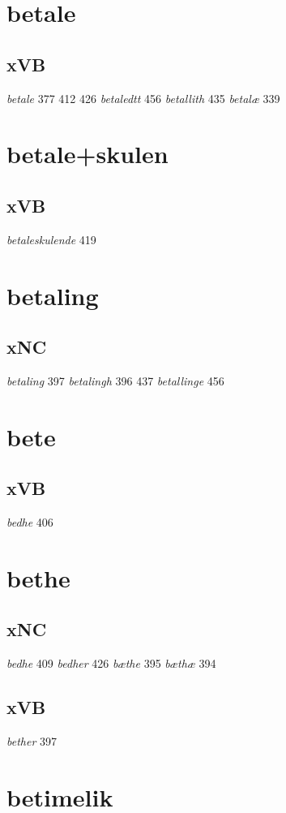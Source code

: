 \documentclass[a4paper,twocolumn]{article}
\begin{document}
\section{betale}
\label{sec:orgb2bbff3}
\subsection{xVB}
\label{sec:org744fdda}
\emph{betale} 377 412 426 \emph{betaledtt} 456 \emph{betallith} 435 \emph{betalæ} 339 
\section{betale+skulen}
\label{sec:org4772072}
\subsection{xVB}
\label{sec:orga3e2f4c}
\emph{betaleskulende} 419 
\section{betaling}
\label{sec:org384f74f}
\subsection{xNC}
\label{sec:org130654a}
\emph{betaling} 397 \emph{betalingh} 396 437 \emph{betallinge} 456 
\section{bete}
\label{sec:org734cd8f}
\subsection{xVB}
\label{sec:org9e4f6a9}
\emph{bedhe} 406 
\section{bethe}
\label{sec:org067b3a7}
\subsection{xNC}
\label{sec:org44c1b2c}
\emph{bedhe} 409 \emph{bedher} 426 \emph{bæthe} 395 \emph{bæthæ} 394 
\subsection{xVB}
\label{sec:org4b9b2a8}
\emph{bether} 397 
\section{betimelik}
\label{sec:org3f7e6a2}
\end{document}
